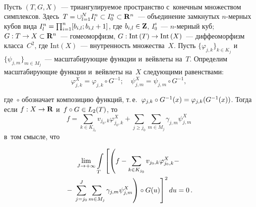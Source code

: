 \begin{multicols}{2}
   \begin{figure*}[b] %
\vspace*{6pt}
  \begin{center}  
    \mbox{%
\epsfxsize=143.174mm
}

\end{center}
\vspace*{-9pt}
\end{figure*}

  Пусть $(T,G,X)$~--- триангулируемое про\-стран\-ст\-во с~конечным множеством 
симплексов. Здесь~$T\hm= \cup^N_{l=1} I_l^n \hm\subset I_0^n\hm\subset 
\mathbf{R}^n$~--- объединение замкнутых $n$-мер\-ных кубов вида $I_l^n\hm= 
\prod^n_{i=1} [ b_{i,l}; b_{i,l}\hm+1]$, где $b_{i,l}\hm\in \mathbf{Z}$, 
$I_0^s$~--- $n$-мер\-ный куб; $G: T\hm\to X\hm\subset \mathbf{R}^n$~--- 
гомеоморфизм, $G: \mathrm{Int}\,(T) \hm \to \mathrm{Int}\,(X)$~--- диффеоморфизм класса~$C^2$, где 
$\mathrm{Int}(X)$~--- внут\-рен\-ность множества~$X$. Пусть $\{\varphi_{j,k}\}_{k\in K_j}$ 
и~$\{\psi_{j,m}\}_{m\in M_j}$~--- масштабирующие функции и~вейвлеты на~$T$. 
Определим мас\-шта\-би\-ру\-ющие функции и~вейвлеты на~$X$ сле\-ду\-ющи\-ми 
равенствами: 
$$
\varphi^X_{j,k} = \varphi_{j,k}\circ G^{-1};\quad
\psi^X_{j,m}=\psi_{j,m}\circ G^{-1},
$$

\columnbreak

\noindent
 где~$\circ$ обозначает композицию функций, т.\,е.\ 
$\varphi_{j,k}\circ G^{-1}(x)\hm= \varphi_{j,k}(G^{-1}(x))$. Тогда если $f: X\hm\to 
\mathbf{R}$ и~$f\circ G\hm\in L_2(T)$, то
$$
f= \sum\limits_{k\in K_{j_0}} 
v_{j_0,k} \varphi^X_{j_0,k}+\sum\limits_{j\geq j_0} \sum\limits_{m\in M_j} 
\gamma_{j,m} \psi^X_{j,m}
$$ 
в~том смыс\-ле, что

\vspace*{-6pt}

\noindent
  \begin{multline*}
  \lim\limits_{J\to +\infty} \int\limits_T \left[ \left(
  \vphantom{\sum\limits^J_{j=j_0}}
   f- \sum\limits_{k\in K_{j_0}} 
v_{j_0,k} \varphi^X_{j_0,k} - \right.\right.\\
{}-\left.\left.\sum\limits^J_{j=j_0} \sum\limits_{m\in M_j} 
\gamma_{j,m} \psi^X_{j,m}\right) \circ G(u)\right]^2 du=0\,.
  \end{multline*}
  

\end{multicols}
